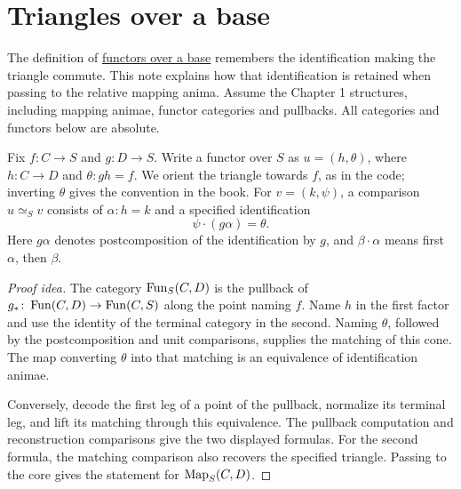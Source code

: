 \documentclass[11pt]{article}
\begin{document}
\section*{Triangles over a base}

The definition of \href{exponentiable-functors.html}{functors over a base}
remembers the identification making the triangle commute. This note explains
how that identification is retained when passing to the relative mapping anima.
Assume the Chapter 1 structures, including mapping animae, functor categories
and pullbacks. All categories and functors below are absolute.

Fix $f\colon C\to S$ and $g\colon D\to S$. Write a functor over $S$ as
$u=(h,\theta)$, where $h\colon C\to D$ and $\theta\colon gh=f$.
We orient the triangle towards $f$, as in the code; inverting $\theta$
gives the convention in the book. For $v=(k,\psi)$, a comparison $u\simeq_S v$
consists of $\alpha\colon h=k$ and a specified identification
\[
 \psi\cdot(g\alpha)=\theta.
\]
Here $g\alpha$ denotes postcomposition of the identification by $g$, and
$\beta\cdot\alpha$ means first $\alpha$, then $\beta$.

\begin{proof}[Proof idea]
The category $\operatorname{Fun}_S(C,D)$ is the pullback of
$g_*\colon\operatorname{Fun}(C,D)\to\operatorname{Fun}(C,S)$ along the point naming $f$.
Name $h$ in the first factor and use the identity of the terminal category
in the second. Naming $\theta$, followed by the postcomposition and unit
comparisons, supplies the matching of this cone. The map converting
$\theta$ into that matching is an equivalence of identification animae.

Conversely, decode the first leg of a point of the pullback, normalize its
terminal leg, and lift its matching through this equivalence. The pullback
computation and reconstruction comparisons give the two displayed formulas.
For the second formula, the matching comparison also recovers the specified
triangle. Passing to the core gives the statement for $\operatorname{Map}_S(C,D)$.
\end{proof}
\end{document}
